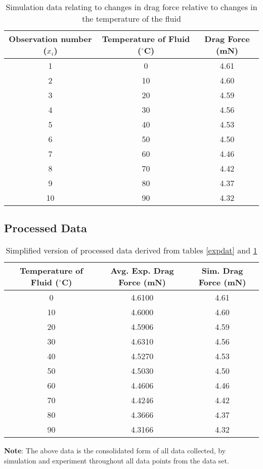 	\begin{table}[H]
		\centering
		\begin{tabular}{|c|c|c|}
			\hline
			\hline
			{Observation number ($x_i$)} & {Temperature of Fluid ($^\circ$C)} & {Drag Force (mN)} \\
			\hline
			\hline
			1 & 0 & 4.61 \\
			\hline
			2 & 10 & 4.60 \\
			\hline
			3 & 20 & 4.59 \\
			\hline
			4 & 30 & 4.56 \\
			\hline
			5 & 40 & 4.53 \\
			\hline
			6 & 50 & 4.50 \\
			\hline
			7 & 60 & 4.46 \\
			\hline
			8 & 70 & 4.42 \\
			\hline
			9 & 80 & 4.37 \\
			\hline
			10 & 90 & 4.32 \\
			\hline
			\hline
		\end{tabular}
		\caption{{Simulation data relating to changes in drag force relative to changes in the temperature of the fluid}}
		\label{simdat}
	\end{table}

\subsection{{Processed Data}}

	\begin{table}[H]
		\centering
		\begin{tabular}{|c|c|c|}
			\hline
			\hline
			{Temperature of Fluid ($^\circ$C)} & {Avg. Exp. Drag Force (mN)} & {Sim. Drag Force (mN)}\\
			\hline
			\hline
			0 & 4.6100 & 4.61 \\
			\hline
			10 & 4.6000 & 4.60 \\
			\hline
			20 & 4.5906 & 4.59 \\
			\hline
			30 & 4.6310 & 4.56 \\
			\hline
			40 & 4.5270 & 4.53 \\
			\hline
			50 & 4.5030 & 4.50 \\
			\hline
			60 & 4.4606 & 4.46 \\
			\hline
			70 & 4.4246 & 4.42 \\
			\hline
			80 & 4.3666 & 4.37 \\
			\hline
			90 & 4.3166 & 4.32 \\
			\hline
			\hline
		\end{tabular}
		\caption{{Simplified version of processed data derived from tables \ref{expdat} and \ref{simdat}}}
		
	\end{table}

	{\textbf{Note}: The above data is the consolidated form of all data collected, by simulation and experiment throughout all data points from the data set.}

